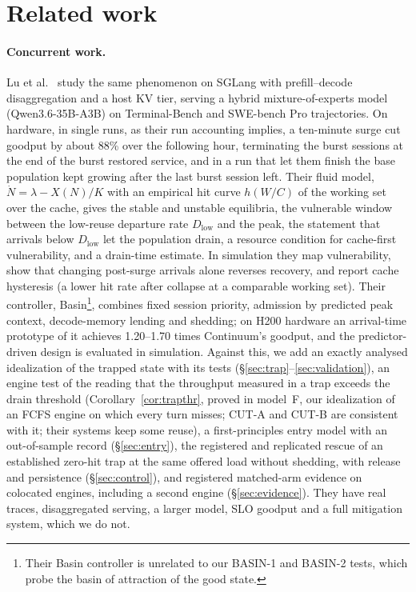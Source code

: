 \section{Related work}\label{sec:related}

\paragraph{Concurrent work.} Lu et al.~\citep{lu2026cachetrap} study the same phenomenon on SGLang with prefill--decode
disaggregation and a host KV tier, serving a hybrid mixture-of-experts model (Qwen3.6-35B-A3B) on Terminal-Bench and SWE-bench Pro
trajectories. On hardware, in single runs, as their run accounting implies, a ten-minute surge cut goodput by about 88\% over the following hour,
terminating the burst sessions at the end of the burst restored service, and in a run that let them finish the base population kept
growing after the last burst session left. Their fluid model, $\dot N=\lambda-X(N)/K$ with an empirical hit curve $h(W/C)$ of the
working set over the cache, gives the stable and unstable equilibria, the vulnerable window between the low-reuse departure rate
$D_{\mathrm{low}}$ and the peak, the statement that arrivals below $D_{\mathrm{low}}$ let the population drain, a resource condition
for cache-first vulnerability, and a drain-time estimate. In simulation they map vulnerability, show that changing post-surge
arrivals alone reverses recovery, and report cache hysteresis (a lower hit rate after collapse at a comparable working set). Their
controller, Basin\footnote{Their Basin controller is unrelated to our BASIN-1 and BASIN-2 tests, which probe the basin of
attraction of the good state.}, combines fixed session priority, admission by predicted peak context, decode-memory lending and
shedding; on H200 hardware an arrival-time prototype of it achieves 1.20--1.70 times Continuum's goodput, and the predictor-driven
design is evaluated in simulation. Against this, we add an exactly analysed idealization of the trapped state with its tests
(\S\ref{sec:trap}--\ref{sec:validation}), an engine test of the reading that the throughput measured in a trap exceeds the drain
threshold (Corollary~\ref{cor:trapthr}, proved in model~F, our idealization of an FCFS engine on which every turn misses; CUT-A and
CUT-B are consistent with it; their systems keep some reuse), a first-principles entry model with an
out-of-sample record (\S\ref{sec:entry}), the registered and replicated rescue of an established zero-hit trap at the same offered
load without shedding, with release and persistence (\S\ref{sec:control}), and registered matched-arm evidence on colocated engines,
including a second engine (\S\ref{sec:evidence}). They have real traces, disaggregated serving, a larger model, SLO goodput and a full
mitigation system, which we do not.

